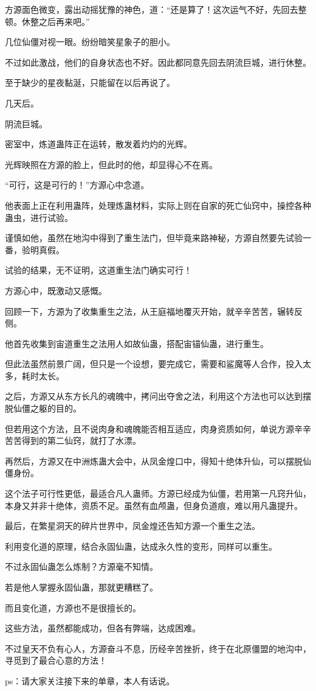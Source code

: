 \begin{this_body}
方源面色微变，露出动摇犹豫的神色，道：“还是算了！这次运气不好，先回去整顿。休整之后再来吧。”

几位仙僵对视一眼。纷纷暗笑星象子的胆小。

不过如此激战，他们的自身状态也不好。因此都同意先回去阴流巨城，进行休整。

至于缺少的星夜黏涎，只能留在以后再说了。

几天后。

阴流巨城。

密室中，炼道蛊阵正在运转，散发着灼灼的光辉。

光辉映照在方源的脸上，但此时的他，却显得心不在焉。

“可行，这是可行的！”方源心中念道。

他表面上正在利用蛊阵，处理炼蛊材料，实际上则在自家的死亡仙窍中，操控各种蛊虫，进行试验。

谨慎如他，虽然在地沟中得到了重生法门，但毕竟来路神秘，方源自然要先试验一番，验明真假。

试验的结果，无不证明，这道重生法门确实可行！

方源心中，既激动又感慨。

回顾一下，方源为了收集重生之法，从王庭福地覆灭开始，就辛辛苦苦，辗转反侧。

他首先收集到宙道重生之法用人如故仙蛊，搭配宙锚仙蛊，进行重生。

但此法虽然前景广阔，但只是一个设想，要完成它，需要和鲨魔等人合作，投入太多，耗时太长。

之后，方源又从东方长凡的魂魄中，拷问出夺舍之法，利用这个方法也可以达到摆脱仙僵之躯的目的。

但若用这个方法，且不说肉身和魂魄能否相互适应，肉身资质如何，单说方源辛辛苦苦得到的第二仙窍，就打了水漂。

再然后，方源又在中洲炼蛊大会中，从凤金煌口中，得知十绝体升仙，可以摆脱仙僵身份。

这个法子可行性更低，最适合凡人蛊师。方源已经成为仙僵，若用第一凡窍升仙，本身又并非十绝体，资质不足。虽然有血颅蛊，但身负道痕，难以用凡蛊提升。

最后，在繁星洞天的碎片世界中，凤金煌还告知方源一个重生之法。

利用变化道的原理，结合永固仙蛊，达成永久性的变形，同样可以重生。

不过永固仙蛊怎么炼制？方源毫不知情。

若是他人掌握永固仙蛊，那就更糟糕了。

而且变化道，方源也不是很擅长的。

这些方法，虽然都能成功，但各有弊端，达成困难。

不过皇天不负有心人，方源奋斗不息，历经辛苦挫折，终于在北原僵盟的地沟中，寻觅到了最合心意的方法！

ps：请大家关注接下来的单章，本人有话说。

\end{this_body}

